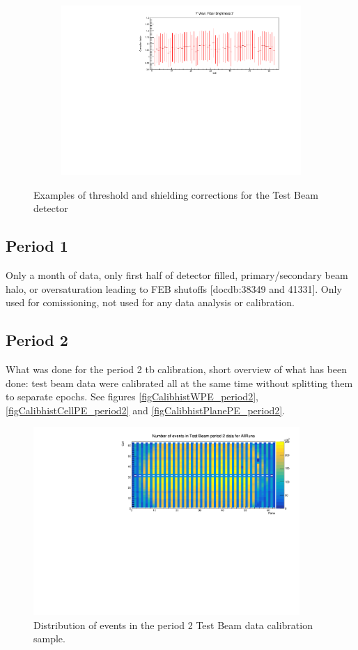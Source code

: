 \documentclass[12pt,a4paper]{article}
\begin{document}
\begin{figure}[hbtp]
\begin{subfigure}[t]{0.9\textwidth}
\includegraphics[width=\textwidth]{Plots/ThresholdCorrectionExample_cyview_fb7_P4DataBasedSim.pdf}
\end{subfigure}
\caption{Examples of threshold and shielding corrections for the Test Beam detector}
\end{figure}

\subsection{Period 1}
Only a month of data, only first half of detector filled, primary/secondary beam halo, or oversaturation leading to FEB shutoffs [docdb:38349 and 41331].
Only used for comissioning, not used for any data analysis or calibration.

\subsection{Period 2}
What was done for the period 2 tb calibration, short overview of what has been done: test beam data were calibrated all at the same time without splitting them to separate epochs. See figures \ref{figCalibhistWPE_period2},\ref{figCalibhistCellPE_period2} and \ref{figCalibhistPlanePE_period2}.

\begin{figure}[!hbtp]
\centering
\includegraphics[width=0.9\textwidth]{Plots/Attenprofs_P2Data_CellPlane_AllRuns.pdf}
\caption{Distribution of events in the period 2 Test Beam data calibration sample.}
\end{figure}
\end{document}
